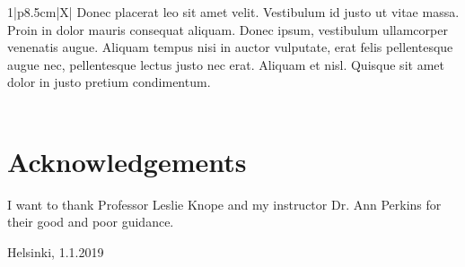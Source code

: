 \documentclass[12pt, a4paper, oneside]{article}
\begin{document}
\begin{table}[h]
\begin{tabularx}{1\textwidth}{|p{8.5cm}|X|}
{            Donec placerat leo sit amet velit. Vestibulum id justo ut vitae massa.
            Proin in dolor mauris consequat aliquam. Donec ipsum, vestibulum ullamcorper venenatis augue.
            Aliquam tempus nisi in auctor vulputate, erat felis pellentesque augue nec,
            pellentesque lectus justo nec erat. Aliquam et nisl. Quisque sit amet dolor in justo pretium condimentum.
        } \\ [13cm] \hline
         \\ [1cm] \hline
    \end{tabularx}
    \label{tab:abstract}
\end{table}

\restoregeometry
\clearpage


\normalsize
\onehalfspacing
\restoregeometry

\section*{Acknowledgements} \label{sec:acknowledgements}

I want to thank Professor Leslie Knope and my instructor Dr. Ann Perkins for their good and poor guidance.

\vspace{1cm}
\begin{FlushRight}
    Helsinki, 1.1.2019 \par
    \thesisauthor
\end{FlushRight}

\clearpage


\doublespacing

\tableofcontents

\clearpage

\listoffigures
\listoftables

\end{document}
